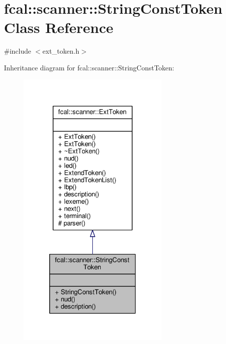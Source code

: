 \hypertarget{classfcal_1_1scanner_1_1StringConstToken}{}\section{fcal\+:\+:scanner\+:\+:String\+Const\+Token Class Reference}
\label{classfcal_1_1scanner_1_1StringConstToken}


{\ttfamily \#include $<$ext\+\_\+token.\+h$>$}



Inheritance diagram for fcal\+:\+:scanner\+:\+:String\+Const\+Token\+:
\nopagebreak
\begin{figure}[H]
\begin{center}
\leavevmode
\includegraphics[width=211pt]{classfcal_1_1scanner_1_1StringConstToken__inherit__graph}
\end{center}
\end{figure}


